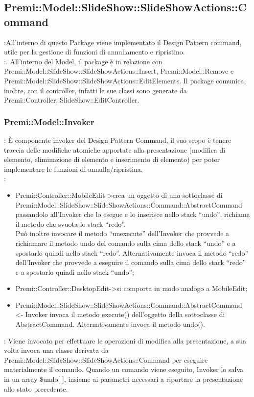    \subsection{Premi::Model::SlideShow::SlideShowActions::Command}{
		\textbf{\tipo}:All’interno di questo Package viene implementato il Design Pattern command, utile per la gestione di funzioni di annullamento e ripristino.\\
		\textbf{\relaz}:. All’interno del Model, il package è in relazione con Premi::Model::SlideShow::SlideShowActions::Insert, Premi::Model::Remove e Premi::Model::SlideShow::SlideShowActions::EditElements. Il package comunica, inoltre, con il controller, infatti le sue classi sono generate da Premi::Controller::SlideShow::EditController.\\
	\subsubsection{Premi::Model::Invoker}{
		\textbf{\tipo}: È componente invoker del Design Pattern Command, il suo scopo è tenere traccia delle modifiche atomiche apportate alla presentazione (modifica di elemento, eliminazione di elemento e inserimento di elemento) per poter implementare le funzioni di annulla/ripristina.\\	
		\textbf{\relaz}:
		\begin{itemize}
			\item Premi::Controller::MobileEdit->crea un oggetto di una sottoclasse di Premi::Model::SlideShow::SlideShowActions::Command::AbstractCommand passandolo all’Invoker che lo esegue e lo inserisce nello stack “undo”, richiama il metodo che svuota lo stack “redo”.\\
			Può inoltre invocare il  metodo “unexecute” dell’Invoker che provvede a richiamare il metodo undo del comando sulla cima dello stack “undo” e a spostarlo quindi nello stack “redo”. Alternativamente invoca il  metodo “redo” dell’Invoker che provvede a eseguire il comando sulla cima dello stack “redo” e a spostarlo quindi nello stack “undo”;
			\item Premi::Controller::DesktopEdit->si comporta in modo analogo a MobileEdit;
			\item Premi::Model::SlideShow::SlideShowActions::Command::AbstractCommand <- Invoker invoca il metodo execute() dell'oggetto della sottoclasse di AbstractCommand. Alternativamente invoca il metodo undo().
		\end{itemize} 
		\textbf{\interfacce}: Viene invocato per effettuare le operazioni di modifica alla presentazione, a sua volta invoca una classe derivata da Premi::Model::SlideShow::SlideShowActions::Command per eseguire materialmente il comando. Quando un comando viene eseguito, Invoker lo salva in un array \$undo[ ], insieme ai parametri necessari a riportare la presentazione allo stato precedente.\\
	}
}
